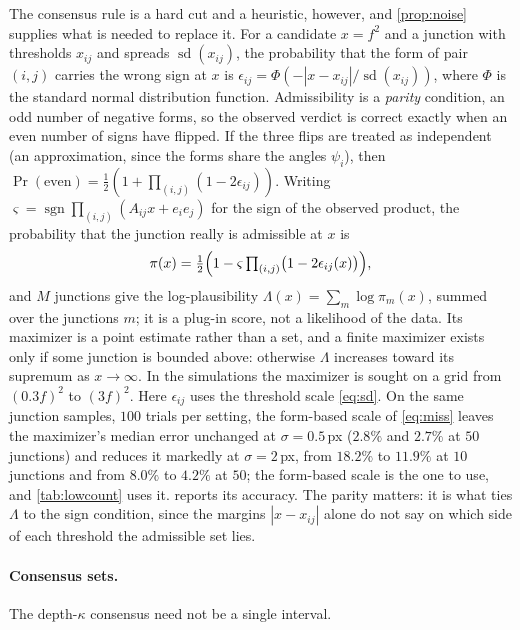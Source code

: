The consensus rule is a hard cut and a heuristic, however, and \cref{prop:noise} supplies what is needed to replace it. For a candidate $x=f^2$ and a junction with thresholds $x_{ij}$ and spreads $\operatorname{sd}(x_{ij})$, the probability that the form of pair $(i,j)$ carries the wrong sign at $x$ is $\epsilon_{ij}=\Phi(-|x-x_{ij}|/\operatorname{sd}(x_{ij}))$, where $\Phi$ is the standard normal distribution function. Admissibility is a \emph{parity} condition, an odd number of negative forms, so the observed verdict is correct exactly when an even number of signs have flipped. If the three flips are treated as independent (an approximation, since the forms share the angles $\psi_i$), then $\Pr(\text{even})=\tfrac12(1+\prod_{(i,j)}(1-2\epsilon_{ij}))$. Writing $\varsigma=\operatorname{sgn}\prod_{(i,j)}(A_{ij}x+e_ie_j)$ for the sign of the observed product, the probability that the junction really is admissible at $x$ is
\begin{equation}
\pi(x)=\tfrac12\Bigl(1-\varsigma\textstyle\prod_{(i,j)}\bigl(1-2\epsilon_{ij}(x)\bigr)\Bigr),
\label{eq:pi}
\end{equation}
and $M$ junctions give the log-plausibility $\Lambda(x)=\sum_m\log\pi_m(x)$, summed over the junctions $m$; it is a plug-in score, not a likelihood of the data. Its maximizer is a point estimate rather than a set, and a finite maximizer exists only if some junction is bounded above: otherwise $\Lambda$ increases toward its supremum as $x\to\infty$. In the simulations the maximizer is sought on a grid from $(0.3f)^2$ to $(3f)^2$. Here $\epsilon_{ij}$ uses the threshold scale \eqref{eq:sd}. On the same junction samples, $100$ trials per setting, the form-based scale of \eqref{eq:miss} leaves the maximizer's median error unchanged at $\sigma=0.5$\,px ($2.8\%$ and $2.7\%$ at $50$ junctions) and reduces it markedly at $\sigma=2$\,px, from $18.2\%$ to $11.9\%$ at $10$ junctions and from $8.0\%$ to $4.2\%$ at $50$; the form-based scale is the one to use, and \cref{tab:lowcount} uses it.  reports its accuracy. The parity matters: it is what ties $\Lambda$ to the sign condition, since the margins $|x-x_{ij}|$ alone do not say on which side of each threshold the admissible set lies.




\paragraph{Consensus sets.} The depth-$\kappa$ consensus need not be a single interval.

